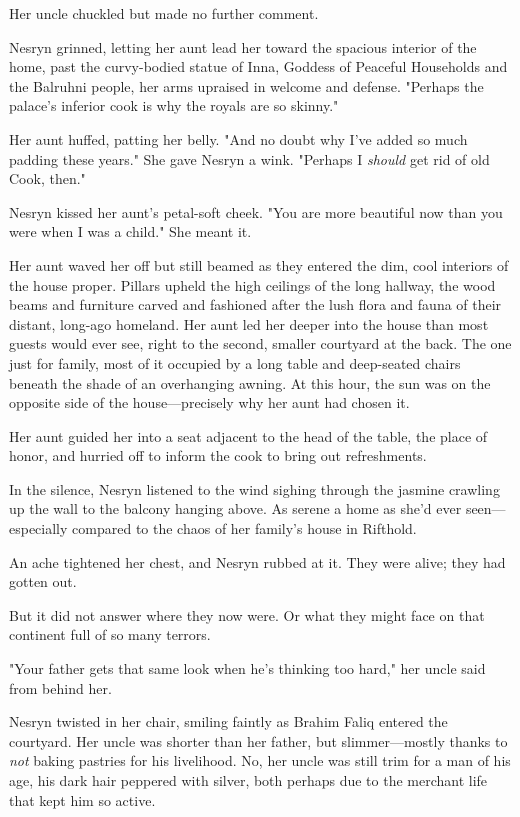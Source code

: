 Her uncle chuckled but made no further comment.

Nesryn grinned, letting her aunt lead her toward the spacious interior of the home, past the curvy-bodied statue of Inna, Goddess of Peaceful Households and the Balruhni people, her arms upraised in welcome and defense.
"Perhaps the palace's inferior cook is why the royals are so skinny."

Her aunt huffed, patting her belly.
"And no doubt why I've added so much padding these years."
She gave Nesryn a wink.
"Perhaps I \emph{should} get rid of old Cook, then."

Nesryn kissed her aunt's petal-soft cheek.
"You are more beautiful now than you were when I was a child."
She meant it.

Her aunt waved her off but still beamed as they entered the dim, cool interiors of the house proper.
Pillars upheld the high ceilings of the long hallway, the wood beams and furniture carved and fashioned after the lush flora and fauna of their distant, long-ago homeland.
Her aunt led her deeper into the house than most guests would ever see, right to the second, smaller courtyard at the back.
The one just for family, most of it occupied by a long table and deep-seated chairs beneath the shade of an overhanging awning.
At this hour, the sun was on the opposite side of the house---precisely why her aunt had chosen it.

Her aunt guided her into a seat adjacent to the head of the table, the place of honor, and hurried off to inform the cook to bring out refreshments.

In the silence, Nesryn listened to the wind sighing through the jasmine crawling up the wall to the balcony hanging above.
As serene a home as she'd ever seen---especially compared to the chaos of her family's house in Rifthold.

An ache tightened her chest, and Nesryn rubbed at it.
They were alive;
they had gotten out.

But it did not answer where they now were.
Or what they might face on that continent full of so many terrors.

"Your father gets that same look when he's thinking too hard," her uncle said from behind her.

Nesryn twisted in her chair, smiling faintly as Brahim Faliq entered the courtyard.
Her uncle was shorter than her father, but slimmer---mostly thanks to \emph{not} baking pastries for his livelihood.
No, her uncle was still trim for a man of his age, his dark hair peppered with silver, both perhaps due to the merchant life that kept him so active.

